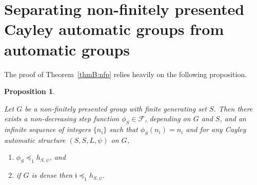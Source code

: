 \documentclass[11pt]{amsart}
\newcommand{\preceqF}{\preceq_1}
\newtheorem{proposition}[theorem]{Proposition}
\theoremstyle{definition}
\newcommand\F{\mathcal F}
\begin{document}
\section{Separating non-finitely presented Cayley automatic groups from automatic groups}


The proof of Theorem~\ref{thmB:nfp} relies heavily on the following proposition.


\begin{proposition}
   \label{prop:nonFP}

Let $G$ be a non-finitely presented group with  finite generating set $S$.  Then there exists a non-decreasing step function $\phi_S \in\F$, depending on $G$ and $S$,  and  an infinite sequence of integers $\{n_i\}$ such that $\phi_S(n_i)=n_i$ and for any Cayley automatic structure $(S,S,L,\psi)$ on $G$,
\begin{enumerate}
    \item
    $\phi_S \preceqF h_{S,\psi}$, and
    \item if $G$ is dense then
    $\mathfrak i\preceqF h_{S,\psi}$.
\end{enumerate}
\end{proposition}
\end{document}
